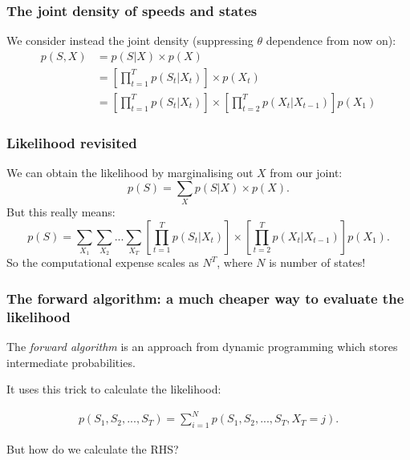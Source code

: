 \documentclass{beamer}
\begin{document}
\begin{frame}
\frametitle{The joint density of speeds and states}

We consider instead the joint density (suppressing $\theta$ dependence from now on):
%
\begin{equation}
    \begin{aligned}
    p(S, X) &= p(S|X) \times p(X)\\
    &= \left[\prod_{t=1}^T p(S_t | X_t)\right] \times p(X_t)\\
    &= \left[\prod_{t=1}^T p(S_t | X_t)\right] \times \left[\prod_{t=2}^T p(X_t | X_{t-1})\right] p(X_1)
    \end{aligned}
\end{equation}
    
\end{frame}

\begin{frame}
\frametitle{Likelihood revisited}

We can obtain the likelihood by marginalising out $X$ from our joint:
%
\begin{equation}
    p(S) = \sum_X p(S|X) \times p(X).
\end{equation}
%
But this really means:
%
\begin{equation}
    p(S) = \sum_{X_1}\sum_{X_2}...\sum_{X_T}\left[\prod_{t=1}^T p(S_t | X_t)\right] \times \left[\prod_{t=2}^T p(X_t | X_{t-1})\right] p(X_1).
\end{equation}
%
So the computational expense scales as $N^T$, where $N$ is number of states!
    
\end{frame}

\begin{frame}
\frametitle{The forward algorithm: a much cheaper way to evaluate the likelihood}

The \textit{forward algorithm} is an approach from dynamic programming which stores intermediate probabilities.

\vspace{0.5cm}

It uses this trick to calculate the likelihood:

\begin{equation}
    \begin{aligned}
    p(S_1, S_2, ..., S_T) = \sum_{i=1}^N p(S_1, S_2, ..., S_T, X_T=j).
    \end{aligned}
\end{equation}

\vspace{0.5cm}

But how do we calculate the RHS?
    
\end{frame}
\end{document}
